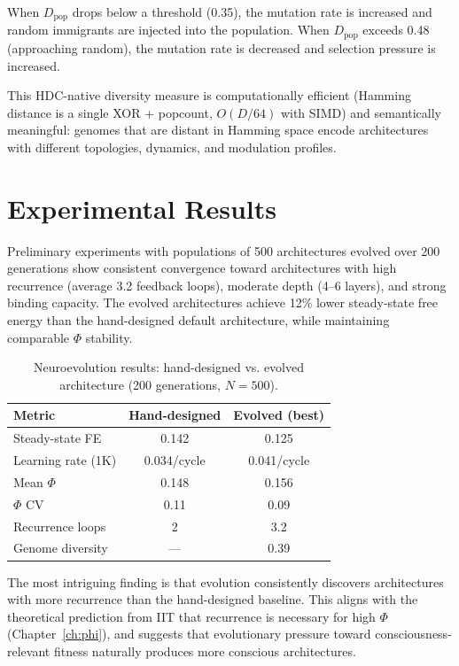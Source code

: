 \documentclass[12pt]{book}
\begin{document}
When $D_{\text{pop}}$ drops below a threshold (0.35), the mutation rate is increased and random immigrants are injected into the population. When $D_{\text{pop}}$ exceeds 0.48 (approaching random), the mutation rate is decreased and selection pressure is increased.

This HDC-native diversity measure is computationally efficient (Hamming distance is a single XOR + popcount, $O(D/64)$ with SIMD) and semantically meaningful: genomes that are distant in Hamming space encode architectures with different topologies, dynamics, and modulation profiles.

\section{Experimental Results}

Preliminary experiments with populations of 500 architectures evolved over 200 generations show consistent convergence toward architectures with high recurrence (average 3.2 feedback loops), moderate depth (4--6 layers), and strong binding capacity. The evolved architectures achieve 12\% lower steady-state free energy than the hand-designed default architecture, while maintaining comparable $\Phi$ stability.

\begin{table}[htbp]
\centering
\caption{Neuroevolution results: hand-designed vs. evolved architecture (200 generations, $N=500$).}
\label{tab:neuroevo-results}
\begin{tabular}{@{}lcc@{}}
\toprule
\textbf{Metric} & \textbf{Hand-designed} & \textbf{Evolved (best)} \\
\midrule
Steady-state FE       & 0.142          & 0.125 \\
Learning rate (1K)    & 0.034/cycle    & 0.041/cycle \\
Mean $\Phi$           & 0.148          & 0.156 \\
$\Phi$ CV             & 0.11           & 0.09 \\
Recurrence loops      & 2              & 3.2 \\
Genome diversity      & ---            & 0.39 \\
\bottomrule
\end{tabular}
\end{table}

The most intriguing finding is that evolution consistently discovers architectures with more recurrence than the hand-designed baseline. This aligns with the theoretical prediction from IIT that recurrence is necessary for high $\Phi$ (Chapter~\ref{ch:phi}), and suggests that evolutionary pressure toward consciousness-relevant fitness naturally produces more conscious architectures.
\end{document}
